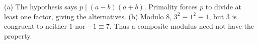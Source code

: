 (a) The hypothesis says $p\mid(a-b)(a+b)$. Primality forces $p$ to divide at least one factor, giving the alternatives. (b) Modulo $8$, $3^2\equiv1^2\equiv1$, but $3$ is congruent to neither $1$ nor $-1\equiv7$. Thus a composite modulus need not have the property.
